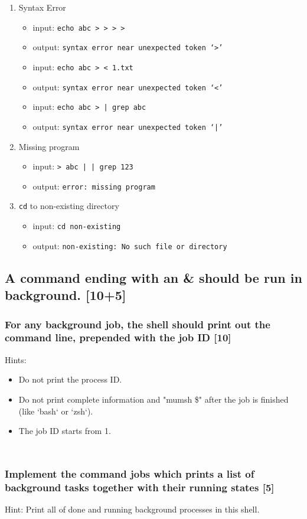 \documentclass[11pt,a4paper]{article}
\newcommand{\example}[2]{
\begin{tcolorbox}[colback=blue!5!white,colframe=blue!75!black,title=Example (#1)]
\begin{minipage}{0.48\linewidth}
\inputminted{shell}{#2.in}
\end{minipage}
\begin{minipage}{0.48\linewidth}
\inputminted{shell}{#2.out}
\end{minipage}
\end{tcolorbox}
}
\begin{document}
\begin{enumerate}
\item Syntax Error
\begin{itemize}
\item input: \texttt{echo abc > > > >}
\item output: \texttt{syntax error near unexpected token `>'}
\item input: \texttt{echo abc > < 1.txt}
\item output: \texttt{syntax error near unexpected token `<'}
\item input: \texttt{echo abc > | grep abc}
\item output: \texttt{syntax error near unexpected token `|'}
\end{itemize}
\item Missing program
\begin{itemize}
\item input: \texttt{> abc | | grep 123}
\item output: \texttt{error: missing program}
\end{itemize}
\item \texttt{cd} to non-existing directory
\begin{itemize}
\item input: \texttt{cd non-existing}
\item output: \texttt{non-existing: No such file or directory}
\end{itemize}
\end{enumerate}

\subsection{A command ending with an \& should be run in background. [10+5]}

\subsubsection{For any background job, the shell should print out the command line, prepended with the job ID [10]}
Hints:
\begin{itemize}
\item Do not print the process ID.
\item Do not print complete information and "mumsh \$" after the job is finished (like `bash` or `zsh`).
\item The job ID starts from 1. 
\end{itemize} 
\example{Final Pretest Case 23}{../test/final_pretest/case23}

\subsubsection{Implement the command jobs which prints a list of background tasks together with their running states [5]}
Hint: Print all of done and running background processes in this shell. \smallskip
\example{Final Pretest Case 23}{../test/final_pretest/case24}
\end{document}
